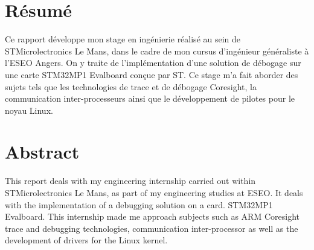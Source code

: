 
\section*{Résumé}
\label{pref:resume}

Ce rapport développe mon stage en ingénierie réalisé au sein de
STMicrolectronics Le Mans, dans le cadre de mon cursus d'ingénieur généraliste
à l'ESEO Angers.  On y traite de l'implémentation d'une solution de débogage
sur une carte STM32MP1 Evalboard conçue par ST. Ce stage m'a fait aborder des
sujets tels que les technologies de trace et de débogage Coresight, la
communication inter-processeurs ainsi que le développement de pilotes pour le
noyau Linux.

\section*{Abstract}
\label{pref:abstract}

This report deals with my engineering internship carried out within
STMicrolectronics Le Mans, as part of my engineering studies at ESEO.  It
deals with the implementation of a debugging solution on a card.  STM32MP1
Evalboard. This internship made me approach subjects such as ARM Coresight
trace and debugging technologies, communication inter-processor as well as the
development of drivers for the Linux kernel.
